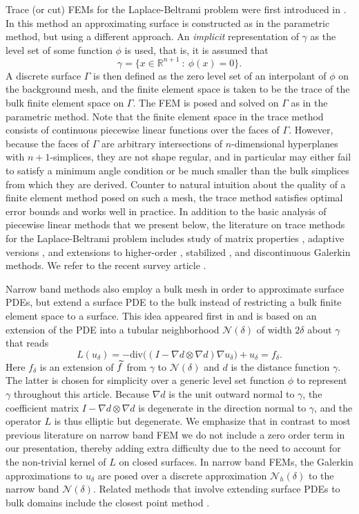Trace (or cut) FEMs for the Laplace-Beltrami problem were first introduced in \cite{ORG09}.  In this method an approximating surface is constructed as in the parametric method, but using a different approach.  An {\it implicit} representation of $\gamma$ as the level set of some function $\phi$ is used, that is, it is assumed that
%
\[
\gamma=\big\{x \in \mathbb{R}^{n+1}~ : ~\phi(x)=0\big\}.
\]
%
A discrete surface $\Gamma$ is then defined as the zero level set of an interpolant of $\phi$ on the background mesh, and the finite element space is taken to be the trace of the bulk finite element space on $\Gamma$.  The FEM is posed and solved on $\Gamma$ as in the parametric method.   Note that the finite element space in the trace method consists of continuous piecewise linear functions over the faces of $\Gamma$.  However, because the faces of $\Gamma$ are arbitrary intersections of $n$-dimensional hyperplanes with $n+1$-simplices, they are not shape regular, and in particular may either fail to satisfy a minimum angle condition or be much smaller than the bulk simplices from which they are derived.  Counter to natural intuition about the quality of a finite element method posed on such a mesh, the trace method satisfies optimal error bounds and works well in practice.  In addition to the basic analysis of piecewise linear methods that we present below, the literature on trace methods for the Laplace-Beltrami problem includes study of matrix properties \cite{OR10}, adaptive versions \cite{DO12, CO15}, and extensions to higher-order \cite{Re15, GR16, GLR18}, stabilized \cite{BHL15, BHLMZ16}, and discontinuous Galerkin \cite{BHLM17} methods.  We refer to the recent survey article \cite{OR17}.

Narrow band methods also employ a bulk mesh in order to approximate surface PDEs, but extend a surface PDE to the bulk instead of restricting a bulk finite element space to a surface. This idea appeared first in \cite{MR1868103} and is based on an extension of the PDE into a tubular neighborhood $\mathcal N(\delta)$ of width $2 \delta$ about $\gamma$ that reads
%
\[
L(u_\delta)=-\textrm{div} \big( (I-\nabla d \otimes \nabla d) \nabla u_\delta \big)+u_\delta
= f_\delta.
\]
%
Here $f_\delta$ is an extension of $\widetilde{f}$ from $\gamma$ to $\mathcal{N}(\delta)$ and $d$ is the distance function $\gamma$. The latter is chosen for simplicity over a generic level set function $\phi$ to represent $\gamma$ throughout this article. Because $\nabla d$ is the unit outward normal to $\gamma$, the coefficient matrix $I-\nabla d \otimes \nabla d$ is degenerate in the direction normal to $\gamma$, and the operator $L$ is thus elliptic but degenerate. We emphasize that in contrast to most previous literature on narrow band FEM we do not include a zero order term in our presentation, thereby adding extra difficulty due to the need to account for the non-trivial kernel of $L$ on closed surfaces. In narrow band FEMs, the Galerkin approximations to $u_\delta$ are posed over a discrete approximation $\mathcal{N}_h(\delta)$ to the narrow band $\mathcal{N}(\delta)$. Related methods that involve extending surface PDEs to bulk domains include the closest point method \cite{RM08}. 

